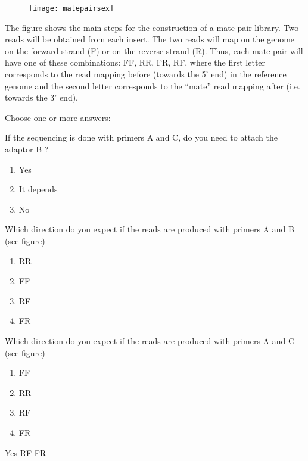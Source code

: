 \begin{Exercise} [
  label={ex23},
  origin={G. Valle}
 ]

\begin{figure}[H]
  \centering
  \texttt{[image: matepairsex]}
\end{figure}

The figure shows the main steps for the construction of a mate pair library.
Two reads will be obtained from each insert. The two reads will map on the
genome on the forward strand (F) or on the reverse strand (R). Thus, each mate
pair will have one of these combinations: FF, RR, FR, RF, where the first
letter corresponds to the read mapping before (towards the 5' end) in the
reference genome and the second letter corresponds to the ``mate'' read  mapping
after (i.e. towards the 3' end).

Choose one or more answers:

\Question If the sequencing is done with primers A and C, do you need to attach
the adaptor B ?
\begin{enumerate}
\item Yes
\item It depends
\item No
\end{enumerate}

\Question Which direction do you expect if the reads are produced with primers
A and B (see figure)
\begin{enumerate}
\item RR
\item FF
\item RF
\item FR
\end{enumerate}

\Question Which direction do you expect if the reads are produced with primers
A and C (see figure)
\begin{enumerate}
\item FF
\item RR
\item RF
\item FR
\end{enumerate}

\end{Exercise}

\begin{Answer} [
  ref={ex23},
  number={1}
 ]

\Question Yes
\Question RF
\Question FR

\end{Answer}

